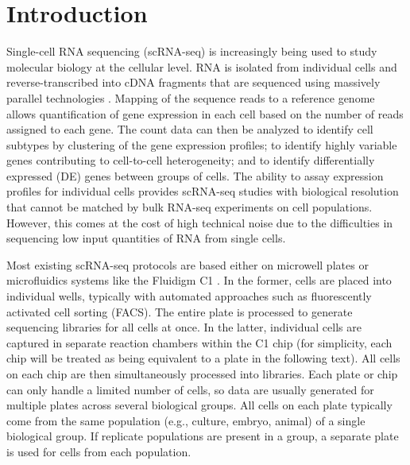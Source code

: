 \documentclass[oupdraft]{bio}
\begin{document}
\newcommand{\suppimplementation}{1}
\newcommand{\suppquantile}{2}
\newcommand{\suppmeanvar}{3}
\newcommand{\suppnorm}{4}

\newcommand{\suppcompsim}{S1}
\newcommand{\suppexpprof}{S2}

\section{Introduction}
Single-cell RNA sequencing (scRNA-seq) is increasingly being used to study molecular biology at the cellular level.
RNA is isolated from individual cells and reverse-transcribed into cDNA fragments that are sequenced using massively parallel technologies \citep{stegle2015computational}.
Mapping of the sequence reads to a reference genome allows quantification of gene expression in each cell based on the number of reads assigned to each gene.
The count data can then be analyzed to identify cell subtypes by clustering of the gene expression profiles;
    to identify highly variable genes contributing to cell-to-cell heterogeneity;
    and to identify differentially expressed (DE) genes between groups of cells.
The ability to assay expression profiles for individual cells provides scRNA-seq studies with biological resolution that cannot be matched by bulk RNA-seq experiments on cell populations.
However, this comes at the cost of high technical noise due to the difficulties in sequencing low input quantities of RNA from single cells.

Most existing scRNA-seq protocols are based either on microwell plates \citep{picelli2014full} or microfluidics systems like the Fluidigm C1 \citep{pollen2014low}.
In the former, cells are placed into individual wells, typically with automated approaches such as fluorescently activated cell sorting (FACS).
The entire plate is processed to generate sequencing libraries for all cells at once.
In the latter, individual cells are captured in separate reaction chambers within the C1 chip 
    (for simplicity, each chip will be treated as being equivalent to a plate in the following text).
All cells on each chip are then simultaneously processed into libraries.
Each plate or chip can only handle a limited number of cells, so data are usually generated for multiple plates across several biological groups. 
All cells on each plate typically come from the same population (e.g., culture, embryo, animal) of a single biological group.
If replicate populations are present in a group, a separate plate is used for cells from each population.
\end{document}
